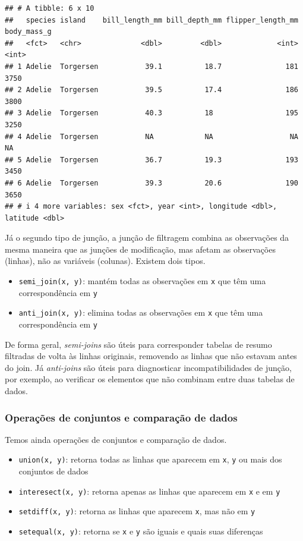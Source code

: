 \documentclass[
]{article}
\providecommand{\tightlist}{%
  \setlength{\itemsep}{0pt}\setlength{\parskip}{0pt}}
\begin{document}
\begin{verbatim}
## # A tibble: 6 x 10
##   species island    bill_length_mm bill_depth_mm flipper_length_mm body_mass_g
##   <fct>   <chr>              <dbl>         <dbl>             <int>       <int>
## 1 Adelie  Torgersen           39.1          18.7               181        3750
## 2 Adelie  Torgersen           39.5          17.4               186        3800
## 3 Adelie  Torgersen           40.3          18                 195        3250
## 4 Adelie  Torgersen           NA            NA                  NA          NA
## 5 Adelie  Torgersen           36.7          19.3               193        3450
## 6 Adelie  Torgersen           39.3          20.6               190        3650
## # i 4 more variables: sex <fct>, year <int>, longitude <dbl>, latitude <dbl>
\end{verbatim}

Já o segundo tipo de junção, a junção de filtragem combina as observações da mesma maneira que as junções de modificação, mas afetam as observações (linhas), não as variáveis (colunas). Existem dois tipos.

\begin{itemize}
\tightlist
\item
  \texttt{semi\_join(x,\ y)}: mantém todas as observações em \texttt{x} que têm uma correspondência em \texttt{y}
\item
  \texttt{anti\_join(x,\ y)}: elimina todas as observações em \texttt{x} que têm uma correspondência em \texttt{y}
\end{itemize}

De forma geral, \emph{semi-joins} são úteis para corresponder tabelas de resumo filtradas de volta às linhas originais, removendo as linhas que não estavam antes do join. Já \emph{anti-joins} são úteis para diagnosticar incompatibilidades de junção, por exemplo, ao verificar os elementos que não combinam entre duas tabelas de dados.

\hypertarget{operauxe7uxf5es-de-conjuntos-e-comparauxe7uxe3o-de-dados}{%
\subsubsection{Operações de conjuntos e comparação de dados}\label{operauxe7uxf5es-de-conjuntos-e-comparauxe7uxe3o-de-dados}}

Temos ainda operações de conjuntos e comparação de dados.

\begin{itemize}
\tightlist
\item
  \texttt{union(x,\ y)}: retorna todas as linhas que aparecem em \texttt{x}, \texttt{y} ou mais dos conjuntos de dados
\item
  \texttt{interesect(x,\ y)}: retorna apenas as linhas que aparecem em \texttt{x} e em \texttt{y}
\item
  \texttt{setdiff(x,\ y)}: retorna as linhas que aparecem \texttt{x}, mas não em \texttt{y}
\item
  \texttt{setequal(x,\ y)}: retorna se \texttt{x} e \texttt{y} são iguais e quais suas diferenças
\end{itemize}
\end{document}
